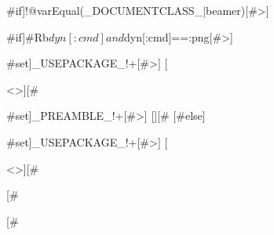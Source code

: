 {#if]!@{varEqual(_DOCUMENTCLASS_|beamer)}[#>]
  {#if]#Rb{$dyn[:cmd] and $dyn[:cmd]==:png}[#>]
    {#set]_USEPACKAGE_!+[#>] [\usepackage[noheadfoot,top=0in,bottom=0in,left=0in,right=0in,mag=1200]{geometry}<\n>][#}
    {#set]_PREAMBLE_!+[#>] [\pagestyle{empty}][#}
  [#else]
    {#set]_USEPACKAGE_!+[#>] [\usepackage[a4paper,pdftex=true]{geometry}<\n>][#}
  [#}
[#}